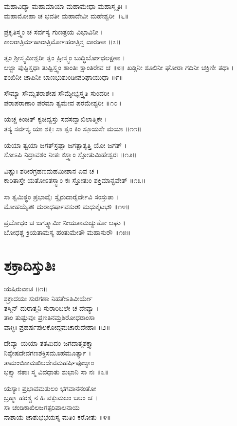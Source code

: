 ಮಹಾವಿದ್ಯಾ ಮಹಾಮಾಯಾ ಮಹಾಮೇಧಾ ಮಹಾಸ್ಮೃತಿಃ ।\\
ಮಹಾಮೋಹಾ ಚ ಭವತೀ ಮಹಾದೇವೀ ಮಹೇಶ್ವರೀ ॥೬॥

ಪ್ರಕೃತಿಸ್ತ್ವಂ ಚ ಸರ್ವಸ್ಯ ಗುಣತ್ರಯ ವಿಭಾವಿನೀ ।\\
ಕಾಲರಾತ್ರಿರ್ಮಹಾರಾತ್ರಿರ್ಮೋಹರಾತ್ರಿಶ್ಚ ದಾರುಣಾ ॥೭॥

ತ್ವಂ ಶ್ರೀಸ್ತ್ವಮೀಶ್ವರೀ ತ್ವಂ ಹ್ರೀಸ್ತ್ವಂ ಬುದ್ಧಿರ್ಬೋಧಲಕ್ಷಣಾ ।\\
ಲಜ್ಜಾ ಪುಷ್ಟಿಸ್ತಥಾ ತುಷ್ಟಿಸ್ತ್ವಂ ಶಾಂತಿಃ ಕ್ಷಾಂತಿರೇವ ಚ ॥೮॥
\newpage
ಖಡ್ಗಿನೀ ಶೂಲಿನೀ ಘೋರಾ ಗದಿನೀ ಚಕ್ರಿಣೀ ತಥಾ ।\\
ಶಂಖಿನೀ ಚಾಪಿನೀ ಬಾಣಭುಶುಂಡೀಪರಿಘಾಯುಧಾ ॥೯॥

ಸೌಮ್ಯಾ ಸೌಮ್ಯತರಾಶೇಷ ಸೌಮ್ಯೇಭ್ಯಸ್ತ್ವತಿ ಸುಂದರೀ ।\\
ಪರಾಪರಾಣಾಂ ಪರಮಾ ತ್ವಮೇವ ಪರಮೇಶ್ವರೀ ॥೧೦॥

ಯಚ್ಚ ಕಿಂಚಿತ್ ಕ್ವಚಿದ್ವಸ್ತು ಸದಸದ್ವಾಖಿಲಾತ್ಮಿಕೇ ।\\
ತಸ್ಯ ಸರ್ವಸ್ಯ ಯಾ ಶಕ್ತಿಃ ಸಾ ತ್ವಂ ಕಿಂ ಸ್ತೂಯಸೇ ಮಯಾ ॥೧೧॥

ಯಯಾ ತ್ವಯಾ ಜಗತ್‌ಸ್ರಷ್ಟಾ ಜಗತ್ಪಾತ್ಯತ್ತಿ ಯೋ ಜಗತ್ ।\\
ಸೋಽಪಿ ನಿದ್ರಾವಶಂ ನೀತಃ ಕಸ್ತ್ವಾಂ ಸ್ತೋತುಮಿಹೇಶ್ವರಃ ॥೧೨॥

ವಿಷ್ಣುಃ ಶರೀರಗ್ರಹಣಮಹಮೀಶಾನ ಏವ ಚ ।\\
ಕಾರಿತಾಸ್ತೇ ಯತೋಽತಸ್ತ್ವಾಂ ಕಃ ಸ್ತೋತುಂ ಶಕ್ತಿಮಾನ್ಭವೇತ್ ॥೧೩॥

ಸಾ ತ್ವಮಿತ್ಥಂ ಪ್ರಭಾವೈಃ ಸ್ವೈರುದಾರೈರ್ದೇವಿ ಸಂಸ್ತುತಾ ।\\
ಮೋಹಯೈತೌ ದುರಾಧರ್ಷಾವಸುರೌ ಮಧುಕೈಟಭೌ ॥೧೪॥

ಪ್ರಬೋಧಂ ಚ ಜಗತ್ಸ್ವಾಮೀ ನೀಯತಾಮಚ್ಯುತೋ ಲಘು ।\\
ಬೋಧಶ್ಚ ಕ್ರಿಯತಾಮಸ್ಯ ಹಂತುಮೇತೌ ಮಹಾಸುರೌ ॥೧೫॥


\section{ಶಕ್ರಾದಿಸ್ತುತಿಃ}
          ಋಷಿರುವಾಚ ॥೧॥\\
     ಶಕ್ರಾದಯಃ ಸುರಗಣಾ ನಿಹತೇಽತಿವೀರ್ಯೇ\\
ತಸ್ಮಿನ್ ದುರಾತ್ಮನಿ ಸುರಾರಿಬಲೇ ಚ ದೇವ್ಯಾ ।\\
     ತಾಂ ತುಷ್ಟುವುಃ ಪ್ರಣತಿನಮ್ರಶಿರೋಧರಾಂಸಾ\\
ವಾಗ್ಭಿಃ ಪ್ರಹರ್ಷಪುಲಕೋದ್ಗಮಚಾರುದೇಹಾಃ ॥೨॥

     ದೇವ್ಯಾ ಯಯಾ ತತಮಿದಂ ಜಗದಾತ್ಮಶಕ್ತ್ಯಾ\\
ನಿಶ್ಶೇಷದೇವಗಣಶಕ್ತಿಸಮೂಹಮೂರ್ತ್ಯಾ ।\\
     ತಾಮಂಬಿಕಾಮಖಿಲದೇವಮಹರ್ಷಿಪೂಜ್ಯಾಂ\\
ಭಕ್ತ್ಯಾ ನತಾಃ ಸ್ಮ ವಿದಧಾತು ಶುಭಾನಿ ಸಾ ನಃ ॥೩॥

     ಯಸ್ಯಾಃ ಪ್ರಭಾವಮತುಲಂ ಭಗವಾನನಂತೋ\\
ಬ್ರಹ್ಮಾ ಹರಶ್ಚ ನ ಹಿ ವಕ್ತುಮಲಂ ಬಲಂ ಚ ।\\
     ಸಾ ಚಂಡಿಕಾಖಿಲಜಗತ್ಪರಿಪಾಲನಾಯ\\
ನಾಶಾಯ ಚಾಶುಭಭಯಸ್ಯ ಮತಿಂ ಕರೋತು ॥೪॥

